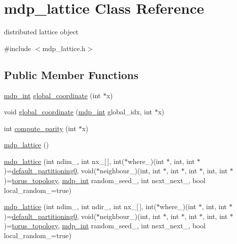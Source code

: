 \hypertarget{classmdp__lattice}{}\section{mdp\+\_\+lattice Class Reference}
\label{classmdp__lattice}


distributed lattice object  




{\ttfamily \#include $<$mdp\+\_\+lattice.\+h$>$}

\subsection*{Public Member Functions}
\begin{DoxyCompactItemize}
\item 
\hyperlink{mdp__global__vars_8h_aaa1ad9d0dcd2124aa5af0120d9954174}{mdp\+\_\+int} \hyperlink{classmdp__lattice_a672142cb946fc501ad8ffc7c0ea01c42}{global\+\_\+coordinate} (int $\ast$x)
\item 
void \hyperlink{classmdp__lattice_af6928ac02766a006f82f6a87eef1019a}{global\+\_\+coordinate} (\hyperlink{mdp__global__vars_8h_aaa1ad9d0dcd2124aa5af0120d9954174}{mdp\+\_\+int} global\+\_\+idx, int $\ast$x)
\item 
int \hyperlink{classmdp__lattice_a3c949964a192c244a6f39df0aaceb1d2}{compute\+\_\+parity} (int $\ast$x)
\item 
\hyperlink{classmdp__lattice_a16771b478cc1e3a6bd70487de44e7a7a}{mdp\+\_\+lattice} ()
\item 
\hyperlink{classmdp__lattice_a90f0e67a6947ec2cab8065cef94d3ceb}{mdp\+\_\+lattice} (int ndim\+\_\+, int nx\+\_\+\mbox{[}$\,$\mbox{]}, int($\ast$where\+\_\+)(int $\ast$, int, int $\ast$)=\hyperlink{mdp__partitionings_8h_a717f073ea8969d6e22c586a8eba267ad}{default\+\_\+partitioning0}, void($\ast$neighbour\+\_\+)(int, int $\ast$, int $\ast$, int $\ast$, int, int $\ast$)=\hyperlink{mdp__topologies_8h_a6aec8ec4cbeb8205be5727f6493824dd}{torus\+\_\+topology}, \hyperlink{mdp__global__vars_8h_aaa1ad9d0dcd2124aa5af0120d9954174}{mdp\+\_\+int} random\+\_\+seed\+\_, int next\+\_\+next\+\_, bool local\+\_\+random\+\_\+=true)
\item 
\hyperlink{classmdp__lattice_afe2d9427fc47225722c0ab3314246a88}{mdp\+\_\+lattice} (int ndim\+\_\+, int ndir\+\_\+, int nx\+\_\+\mbox{[}$\,$\mbox{]}, int($\ast$where\+\_\+)(int $\ast$, int, int $\ast$)=\hyperlink{mdp__partitionings_8h_a717f073ea8969d6e22c586a8eba267ad}{default\+\_\+partitioning0}, void($\ast$neighbour\+\_\+)(int, int $\ast$, int $\ast$, int $\ast$, int, int $\ast$)=\hyperlink{mdp__topologies_8h_a6aec8ec4cbeb8205be5727f6493824dd}{torus\+\_\+topology}, \hyperlink{mdp__global__vars_8h_aaa1ad9d0dcd2124aa5af0120d9954174}{mdp\+\_\+int} random\+\_\+seed\+\_, int next\+\_\+next\+\_, bool local\+\_\+random\+\_\+=true)

\end{DoxyCompactItemize}
